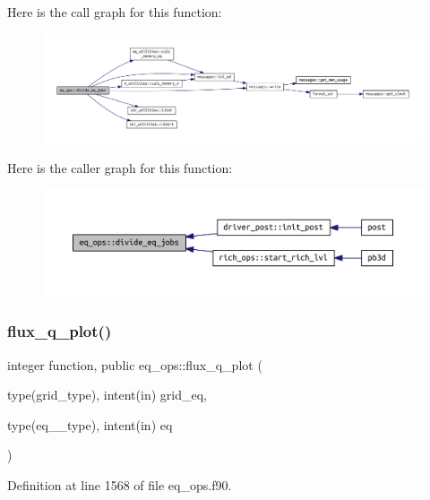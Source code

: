 Here is the call graph for this function\+:
\nopagebreak
\begin{figure}[H]
\begin{center}
\leavevmode
\includegraphics[width=350pt]{namespaceeq__ops_a8fae749abe55865d8135fef536a8e8f1_cgraph}
\end{center}
\end{figure}
Here is the caller graph for this function\+:
\nopagebreak
\begin{figure}[H]
\begin{center}
\leavevmode
\includegraphics[width=350pt]{namespaceeq__ops_a8fae749abe55865d8135fef536a8e8f1_icgraph}
\end{center}
\end{figure}
\mbox{\label{namespaceeq__ops_af0effe20188d46a44680c2648e4572e9}} 
\subsubsection{\texorpdfstring{flux\+\_\+q\+\_\+plot()}{flux\_q\_plot()}}
{\footnotesize\ttfamily integer function, public eq\+\_\+ops\+::flux\+\_\+q\+\_\+plot (\begin{DoxyParamCaption}\item[{type(grid\+\_\+type), intent(in)}]{grid\+\_\+eq,  }\item[{type(eq\+\_\+1\+\_\+type), intent(in)}]{eq }\end{DoxyParamCaption})}



Definition at line 1568 of file eq\+\_\+ops.\+f90.

